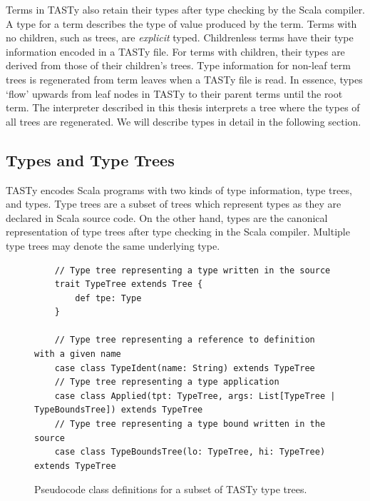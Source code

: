 Terms in TASTy also retain their types after type checking by the Scala compiler.
A type for a term describes the type of value produced by the term.
Terms with no children, such as  trees, are \textit{explicit} typed.
Childrenless terms have their type information encoded in a TASTy file.  
For terms with children, their types are derived from those of their children's trees.
Type information for non-leaf term trees is regenerated from term leaves when a TASTy file is read.
In essence, types `flow' upwards from leaf nodes in TASTy to their parent terms until the root term.
The interpreter described in this thesis interprets a tree where the types of all trees are regenerated.
We will describe types in detail in the following section.

\subsection{Types and Type Trees}

TASTy encodes Scala programs with two kinds of type information, type trees, and types.
Type trees are a subset of trees which represent types as they are declared in Scala source code.
On the other hand, types are the canonical representation of type trees after type checking in the Scala compiler.
Multiple type trees may denote the same underlying type.

\begin{figure}[!htb]
	\begin{verbatim}
	// Type tree representing a type written in the source
	trait TypeTree extends Tree {
		def tpe: Type
	}
	
	// Type tree representing a reference to definition with a given name
	case class TypeIdent(name: String) extends TypeTree 
	// Type tree representing a type application
	case class Applied(tpt: TypeTree, args: List[TypeTree | TypeBoundsTree]) extends TypeTree
	// Type tree representing a type bound written in the source
	case class TypeBoundsTree(lo: TypeTree, hi: TypeTree) extends TypeTree
	\end{verbatim} 
	\caption{Pseudocode class definitions for a subset of TASTy type trees.}
	\label{tasty:type-trees}
\end{figure}


